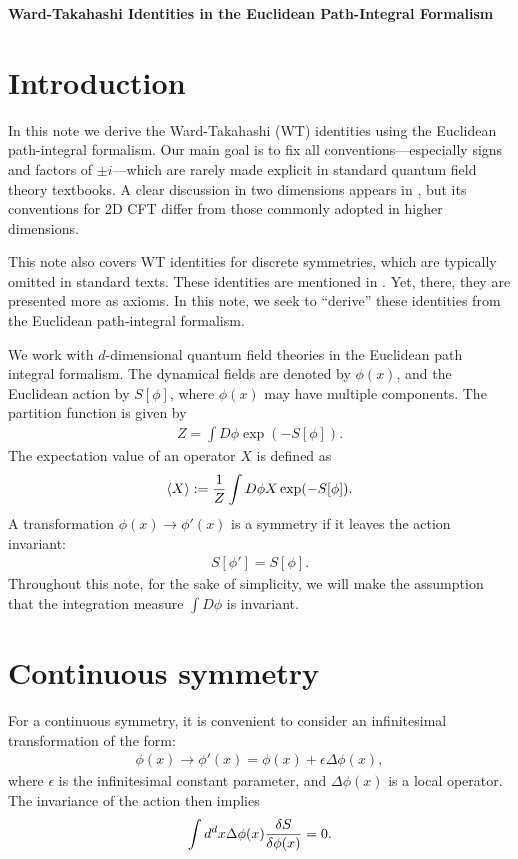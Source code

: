 \documentclass[12pt]{scrartcl}
\begin{document}
\begin{center}
{\bfseries \sffamily \LARGE Ward-Takahashi Identities in the Euclidean Path-Integral Formalism}  \\

\vspace{0.5cm}
\end{center}

\section{Introduction}
In this note we derive the Ward-Takahashi (WT) identities using the Euclidean path-integral formalism.  Our main goal is to fix all conventions—especially signs and factors of $\pm i$—which are rarely made explicit in standard quantum field theory textbooks.  A clear discussion in two dimensions appears in \cite{Polchinski:1998rq}, but its conventions for 2D CFT differ from those commonly adopted in higher dimensions.

This note also covers WT identities for discrete symmetries, which are typically omitted in standard texts. These identities are mentioned in \cite{Gaiotto:2014kfa}. Yet, there, they are presented more as axioms. In this note, we seek to ``derive'' these identities from the Euclidean path-integral formalism.

We work with $d$-dimensional quantum field theories in the Euclidean path integral formalism. The dynamical fields are denoted by $\phi(x)$, and the Euclidean action by $S[\phi]$, where $\phi(x)$ may have multiple components. The partition function is given by
\begin{align}
    Z=\int D\phi \exp(-S[\phi]).
\end{align}
The expectation value of an operator $X$ is defined as
\begin{align}
    \expval{X}:=\frac{1}{Z}\int D\phi X \exp(-S[\phi]).
\end{align}
A transformation $\phi(x)\to \phi'(x)$ is a symmetry if it leaves the action invariant:
\begin{align}
    S[\phi']=S[\phi].
\end{align}
Throughout this note, for the sake of simplicity, we will make the assumption that the integration measure $\int D\phi $ is invariant.

\section{Continuous symmetry}
For a continuous symmetry, it is convenient to consider an infinitesimal transformation of the form:
\begin{align}
    \phi(x)\to \phi'(x)=\phi(x)+\epsilon \Delta \phi(x),
\end{align}
where $\epsilon$ is the infinitesimal constant parameter, and $\Delta\phi(x)$ is a local operator.  The invariance of the action then implies
\begin{align}
    \int d^dx\Delta \phi(x)\fdv{S}{\phi(x)}=0.
\end{align}
\end{document}
